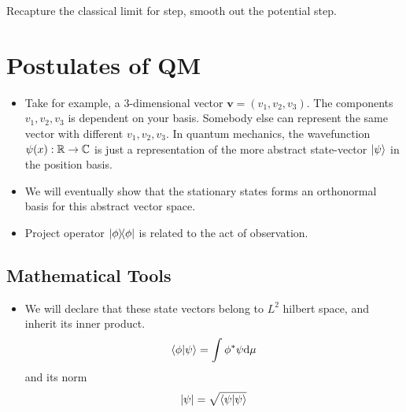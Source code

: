 \documentclass[12pt]{article}
\begin{document}
Recapture the classical limit for step, smooth out the potential step.

\section{Postulates of QM}
\begin{itemize}
    \item Take for example, a $3$-dimensional vector $\mathbf v=(v_1,v_2,v_3).$ The components $v_1,v_2,v_3$ is dependent on your basis. Somebody else can represent the same vector with different $v_1,v_2,v_3.$ In quantum mechanics, the wavefunction $\psi(x):\mathbb{R}\to\mathbb{C}$ is just a representation of the more abstract state-vector $\ket\psi$ in the position basis.
    \item We will eventually show that the stationary states forms an orthonormal basis for this abstract vector space.
    \item Project operator $\ketbra{\phi}{\phi}$ is related to the act of observation.
\end{itemize}
\subsection{Mathematical Tools}
\begin{itemize}
    \item We will declare that these state vectors belong to $L^2$ hilbert space, and inherit its inner product.\begin{equation}
        \braket{\phi}{\psi}=\int\phi^*\psi\dd\mu
    \end{equation}
    and its norm \begin{equation}
        |\psi|=\sqrt{\braket{\psi}{\psi}}
    \end{equation}
\end{itemize}
\end{document}
